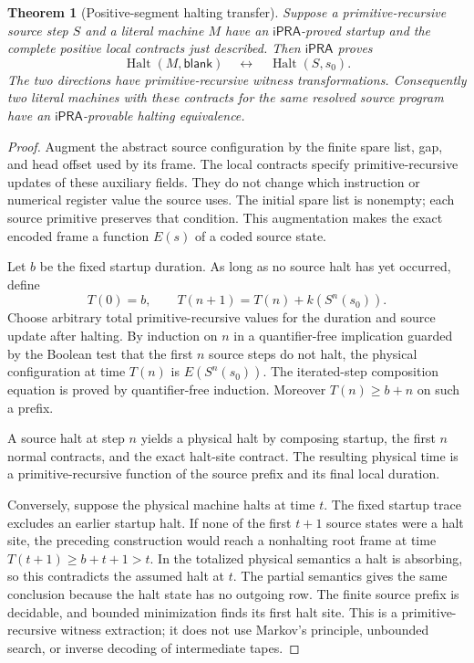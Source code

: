 \documentclass[11pt]{article}
\newtheorem{theorem}{Theorem}
\newcommand{\ipra}{\mathsf{iPRA}}
\begin{document}
\begin{theorem}[Positive-segment halting transfer]\label{thm:physical}
Suppose a primitive-recursive source step $S$ and a literal machine $M$
have an $\ipra$-proved startup and the complete positive local contracts
just described. Then $\ipra$ proves
\[
 \operatorname{Halt}(M,\mathsf{blank})
 \quad\longleftrightarrow\quad
 \operatorname{Halt}(S,s_0).
\]
The two directions have primitive-recursive witness transformations.
Consequently two literal machines with these contracts for the same
resolved source program have an $\ipra$-provable halting equivalence.
\end{theorem}
\begin{proof}
Augment the abstract source configuration by the finite spare list, gap,
and head offset used by its frame. The local contracts specify
primitive-recursive updates of these auxiliary fields. They do not change
which instruction or numerical register value the source uses. The
initial spare list is nonempty; each source primitive preserves that
condition. This augmentation makes the exact encoded frame a function
$E(s)$ of a coded source state.

Let $b$ be the fixed startup duration. As long as no source halt has yet
occurred, define
\[
 T(0)=b,\qquad T(n+1)=T(n)+k(S^n(s_0)).
\]
Choose arbitrary total primitive-recursive values for the duration and
source update after halting. By induction on $n$ in a quantifier-free
implication guarded by the Boolean test that the first $n$ source steps
do not halt, the physical configuration at time $T(n)$ is $E(S^n(s_0))$.
The iterated-step composition equation is proved by quantifier-free
induction. Moreover $T(n)\ge b+n$ on such a prefix.

A source halt at step $n$ yields a physical halt by composing startup,
the first $n$ normal contracts, and the exact halt-site contract.
The resulting physical time is a primitive-recursive function of the
source prefix and its final local duration.

Conversely, suppose the physical machine halts at time $t$. The fixed
startup trace excludes an earlier startup halt. If none of the first
$t+1$ source states were a halt site, the preceding construction would
reach a nonhalting root frame at time $T(t+1)\ge b+t+1>t$.
In the totalized physical semantics a halt is absorbing, so this
contradicts the assumed halt at $t$. The partial semantics gives the same
conclusion because the halt state has no outgoing row. The finite source
prefix is decidable, and bounded minimization finds its first halt site.
This is a primitive-recursive witness extraction; it does not use Markov's
principle, unbounded search, or inverse decoding of intermediate tapes.
\end{proof}
\end{document}
